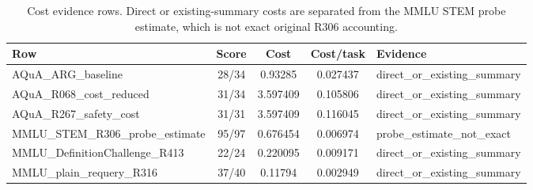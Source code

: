 \begin{table}[t]
\centering
\small
\caption{Cost evidence rows. Direct or existing-summary costs are separated from the MMLU STEM probe estimate, which is not exact original R306 accounting.}
\label{tab:cost-results}
\begin{tabular}{lcccl}
\toprule
Row & Score & Cost & Cost/task & Evidence \\
\midrule
AQuA\_ARG\_baseline & 28/34 & 0.93285 & 0.027437 & direct\_or\_existing\_summary \\
AQuA\_R068\_cost\_reduced & 31/34 & 3.597409 & 0.105806 & direct\_or\_existing\_summary \\
AQuA\_R267\_safety\_cost & 31/31 & 3.597409 & 0.116045 & direct\_or\_existing\_summary \\
MMLU\_STEM\_R306\_probe\_estimate & 95/97 & 0.676454 & 0.006974 & probe\_estimate\_not\_exact \\
MMLU\_DefinitionChallenge\_R413 & 22/24 & 0.220095 & 0.009171 & direct\_or\_existing\_summary \\
MMLU\_plain\_requery\_R316 & 37/40 & 0.11794 & 0.002949 & direct\_or\_existing\_summary \\
\bottomrule
\end{tabular}
\end{table}
